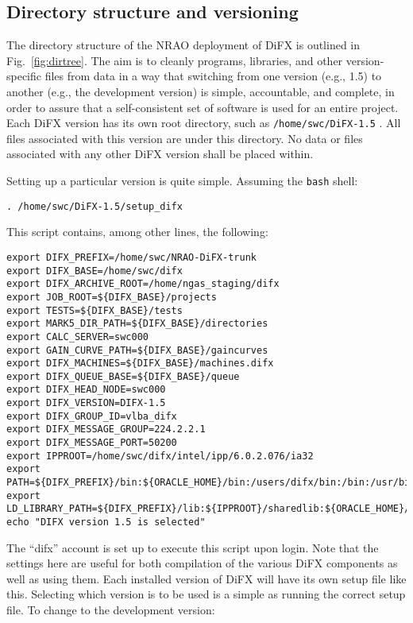 \subsection{Directory structure and versioning} \label{sec:versions}

The directory structure of the NRAO deployment of DiFX is outlined in Fig.~\ref{fig:dirtree}.
The aim is to cleanly programs, libraries, and other version-specific files from data in a way that switching from one version (e.g., 1.5) to another (e.g., the development version) is simple, accountable, and complete, in order to assure that a self-consistent set of software is used for an entire project.
Each DiFX version has its own root directory, such as {\tt /home/swc/DiFX-1.5} .
All files associated with this version are under this directory.
No data or files associated with any other DiFX version shall be placed within.

Setting up a particular version is quite simple.
Assuming the {\tt bash} shell:

{\tt . /home/swc/DiFX-1.5/setup\_difx}

This script contains, among other lines, the following:

\begin{verbatim}
export DIFX_PREFIX=/home/swc/NRAO-DiFX-trunk
export DIFX_BASE=/home/swc/difx
export DIFX_ARCHIVE_ROOT=/home/ngas_staging/difx
export JOB_ROOT=${DIFX_BASE}/projects
export TESTS=${DIFX_BASE}/tests
export MARK5_DIR_PATH=${DIFX_BASE}/directories
export CALC_SERVER=swc000
export GAIN_CURVE_PATH=${DIFX_BASE}/gaincurves
export DIFX_MACHINES=${DIFX_BASE}/machines.difx
export DIFX_QUEUE_BASE=${DIFX_BASE}/queue
export DIFX_HEAD_NODE=swc000
export DIFX_VERSION=DIFX-1.5
export DIFX_GROUP_ID=vlba_difx
export DIFX_MESSAGE_GROUP=224.2.2.1
export DIFX_MESSAGE_PORT=50200
export IPPROOT=/home/swc/difx/intel/ipp/6.0.2.076/ia32
export PATH=${DIFX_PREFIX}/bin:${ORACLE_HOME}/bin:/users/difx/bin:/bin:/usr/bin
export LD_LIBRARY_PATH=${DIFX_PREFIX}/lib:${IPPROOT}/sharedlib:${ORACLE_HOME}/lib
echo "DIFX version 1.5 is selected"
\end{verbatim}

The ``difx'' account is set up to execute this script upon login.
Note that the settings here are useful for both compilation of the various DiFX components as well as using them.
Each installed version of DiFX will have its own setup file like this.
Selecting which version is to be used is a simple as running the correct setup file.
To change to the development version:

